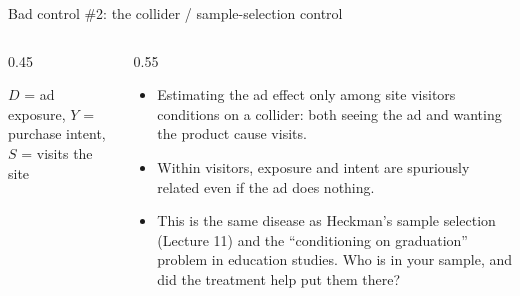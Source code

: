 \documentclass[aspectratio=169,11pt]{beamer}
\begin{document}
\begin{frame}{Bad control \#2: the collider / sample-selection control}
\begin{columns}
\begin{column}{0.45\textwidth}
\begin{center}
\end{center}
\smallskip
{\small $D$ = ad exposure, $Y$ = purchase intent, $S$ = visits the site}
\end{column}
\begin{column}{0.55\textwidth}
\begin{itemize}
	\item Estimating the ad effect \alert{only among site visitors} conditions on a
	collider: both seeing the ad and wanting the product cause visits.

	\item Within visitors, exposure and intent are spuriously related even if the ad
	does nothing.

	\item This is the same disease as Heckman's sample selection (Lecture 11) and the
	``conditioning on graduation'' problem in education studies. \alert{Who is in your
	sample, and did the treatment help put them there?}
\end{itemize}
\end{column}
\end{columns}
\end{frame}
\end{document}

